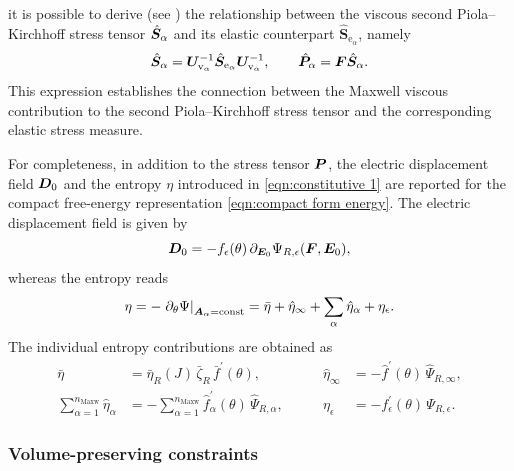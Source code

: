 %
it is possible to derive (see \cite{Liu2025}) the relationship between the viscous second Piola--Kirchhoff stress tensor $\hat{\boldsymbol{S}}_{\alpha}$ and its elastic counterpart $\hat{\boldsymbol{S}}_{\mathrm{e}_\alpha}$, namely
%
\begin{equation}
	\label{eqn:Sea_Uva}
	\hat{\boldsymbol{S}}_{\alpha}
	=
	\boldsymbol{U}_{\mathrm{v}_\alpha}^{-1}
	\hat{\boldsymbol{S}}_{\mathrm{e}_\alpha}
	\boldsymbol{U}_{\mathrm{v}_\alpha}^{-1},
	\qquad
	\hat{\boldsymbol{P}}_{\alpha}
	=
	\boldsymbol{F}\hat{\boldsymbol{S}}_{\alpha}.
\end{equation}
%
This expression establishes the connection between the Maxwell viscous contribution to the second Piola--Kirchhoff stress tensor and the corresponding elastic stress measure.

For completeness, in addition to the stress tensor $\boldsymbol{P}$, the electric displacement field $\boldsymbol{D}_0$ and the entropy $\eta$ introduced in \eqref{eqn:constitutive 1} are reported for the compact free-energy representation \eqref{eqn:compact form energy}. The electric displacement field is given by
%
\begin{equation}
	\boldsymbol{D}_0
	=
	-f_{\epsilon}(\theta)\,
	\partial_{\boldsymbol{E}_0}
	\Psi_{R,\epsilon}(\boldsymbol{F},\boldsymbol{E}_0),
\end{equation}
%
whereas the entropy reads
%
\begin{equation}
	\label{eqn:visco_entropy}
	\eta
	=
	-\left.
	{\partial_{\theta}}\Psi
	\right|_{\boldsymbol{A}_{\alpha}=\text{const}}
	=
	\bar\eta
	+
	\hat\eta_\infty
	+
	\sum_{\alpha}\hat\eta_\alpha
	+
	\eta_\epsilon .
\end{equation}
%
The individual entropy contributions are obtained as
%
\begin{equation}
	\begin{aligned}
		\bar\eta
		&=
		\bar\eta_R(J)\,
		\bar\zeta_R\,
		\bar f^{\prime}(\theta),
		&\qquad
		\hat\eta_\infty
		&=
		-\hat{f}^{\prime}(\theta)\,
		\hat\Psi_{R,\infty},
		\\
		\sum_{\alpha=1}^{n_{\text{Maxw}}}\hat\eta_{\alpha}
		&=
		-\sum_{\alpha=1}^{n_{\text{Maxw}}}
		\hat{f}_{\alpha}^{\prime}(\theta)\,
		\hat\Psi_{R,\alpha},
		&\qquad
		\eta_{\epsilon}
		&=
		-
		{f}_{\epsilon}^{\prime}(\theta)\,
		\Psi_{R,\epsilon}.
	\end{aligned}
\end{equation}


\subsubsection{Volume-preserving constraints}
\label{sec:volume-preserving_constraints}

